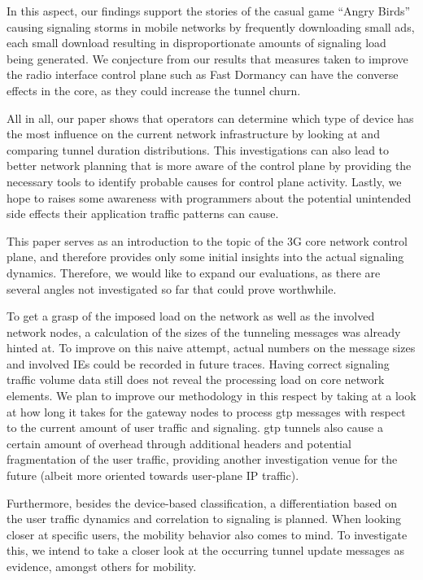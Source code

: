 In this aspect, our findings support the stories of the casual game ``Angry Birds'' causing signaling storms in mobile networks by frequently downloading small ads, each small download resulting in disproportionate amounts of signaling load being generated. We conjecture from our results that measures taken to improve the radio interface control plane such as Fast Dormancy can have the converse effects in the core, as they could increase the tunnel churn.


All in all, our paper shows that operators can determine which type of device has the most influence on the current network infrastructure by looking at and comparing tunnel duration distributions. %
This investigations can also lead to better network planning that is more aware of the control plane by providing the necessary tools to identify probable causes for control plane activity. Lastly, we hope to raises some awareness with programmers about the potential unintended side effects their application traffic patterns can cause.

This paper serves as an introduction to the topic of the 3G core network control plane, and therefore provides only some initial insights into the actual signaling dynamics. Therefore, we would like to expand our evaluations, as there are several  angles not investigated so far that could prove worthwhile.

To get a grasp of the imposed load on the network as well as the involved network nodes, a calculation of the sizes of the tunneling messages was already hinted at. To improve on this naive attempt, actual numbers on the message sizes and involved \glspl{IE} could be recorded in future traces. Having correct signaling traffic volume data still does not reveal the processing load on core network elements. We plan to improve our methodology in this respect by taking at a look at how long it takes for the gateway nodes to process \gls{gtp} messages with respect to the current amount of user traffic and signaling. \gls{gtp} tunnels also cause a certain amount of overhead through additional headers and potential fragmentation of the user traffic, providing another investigation venue for the future (albeit more oriented towards user-plane IP traffic). 

Furthermore, besides the device-based classification, a differentiation based on the user traffic dynamics and correlation to signaling is planned. When looking closer at specific users, the mobility behavior also comes to mind. To investigate this, we intend to take a closer look at the occurring tunnel update messages as evidence, amongst others for mobility.

